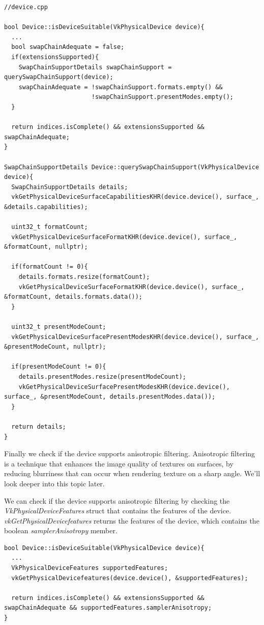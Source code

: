 \documentclass[12pt]{report} \usepackage{preamble}
\begin{document}
\begin{lstlisting}[Language=C++]
//device.cpp

bool Device::isDeviceSuitable(VkPhysicalDevice device){
  ...
  bool swapChainAdequate = false;
  if(extensionsSupported){
    SwapChainSupportDetails swapChainSupport = querySwapChainSupport(device);
    swapChainAdequate = !swapChainSupport.formats.empty() &&
                        !swapChainSupport.presentModes.empty();
  }

  return indices.isComplete() && extensionsSupported && swapChainAdequate;
}

SwapChainSupportDetails Device::querySwapChainSupport(VkPhysicalDevice device){
  SwapChainSupportDetails details;
  vkGetPhysicalDeviceSurfaceCapabilitiesKHR(device.device(), surface_, &details.capabilities);

  uint32_t formatCount;
  vkGetPhysicalDeviceSurfaceFormatKHR(device.device(), surface_, &formatCount, nullptr);

  if(formatCount != 0){
    details.formats.resize(formatCount);
    vkGetPhysicalDeviceSurfaceFormatKHR(device.device(), surface_, &formatCount, details.formats.data());
  }

  uint32_t presentModeCount;
  vkGetPhysicalDeviceSurfacePresentModesKHR(device.device(), surface_, &presentModeCount, nullptr);

  if(presentModeCount != 0){
    details.presentModes.resize(presentModeCount);
    vkGetPhysicalDeviceSurfacePresentModesKHR(device.device(), surface_, &presentModeCount, details.presentModes.data());
  }

  return details;
}
\end{lstlisting}

Finally we check if the device supports anisotropic filtering. Anisotropic filtering is a technique
that enhances the image quality of textures on surfaces, by reducing blurriness that can occur when
rendering texture on a sharp angle. We'll look deeper into this topic later.

We can check if the device supports anisotropic filtering by checking the \textit{VkPhysicalDeviceFeatures}
struct that contains the features of the device. \textit{vkGetPhysicalDevicefeatures} returns the features
of the device, which contains the boolean \textit{samplerAnisotropy} member.

\begin{lstlisting}[Language=C++]
bool Device::isDeviceSuitable(VkPhysicalDevice device){
  ...
  VkPhysicalDeviceFeatures supportedFeatures;
  vkGetPhysicalDevicefeatures(device.device(), &supportedFeatures);

  return indices.isComplete() && extensionsSupported && swapChainAdequate && supportedFeatures.samplerAnisotropy;
}
\end{lstlisting}
\end{document}

